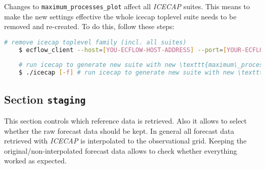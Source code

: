\documentclass[DIV=10, parskip=full]{scrreprt}
\newcommand{\ice}{\textit{ICECAP}\xspace}
\begin{document}
 Changes to \texttt{maximum\_processes\_plot} affect all \ice suites. This means to make the new settings effective the whole icecap toplevel suite needs to be removed and re-created. To do this, follow these steps:
  \begin{lstlisting}[language=bash, float]
 	# remove icecap toplevel family (incl. all suites)
 	$ ecflow_client --host=[YOU-ECFLOW-HOST-ADDRESS] --port=[YOUR-ECFLOW-PORT]] --delete /icecap
 	
 	# run icecap to generate new suite with new \texttt{maximum\_processes\_plot} value
 	$ ./icecap [-f] # run icecap to generate new suite with new \texttt{maximum\_processes\_plot} value
 \end{lstlisting}
 


\subsection{Section \texttt{staging}} \label{sec:config_staging}
This section controls which reference data is retrieved. Also it allows to select whether the raw forecast data should be kept. In general all forecast data retrieved with \ice is interpolated to the observational grid. Keeping the original/non-interpolated forecast data allows to check whether everything worked as expected. 
 
\end{document}
